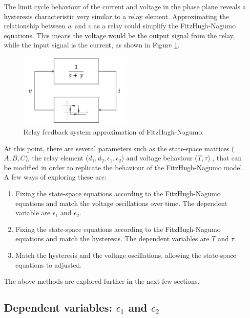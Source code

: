 \documentclass[a4paper]{article}
\begin{document}
The limit cycle behaviour of the current and voltage in the phase plane reveals a hysteresis characteristic very similar to a relay element. Approximating the relationship between $w$ and $v$ as a relay could simplify the FitzHugh-Nagumo equations. This means the voltage would be the output signal from the relay, while the input signal is the current, as shown in Figure \ref{fn_transfer}. 

\begin{figure}
\includegraphics[width = 0.5\textwidth]{fitz_relay_transfer}
\caption{Relay feedback system approximation of FitzHugh-Nagumo.}
\label{fn_transfer}
\end{figure}

At this point, there are several parameters such as the state-space matrices ($A, B, C$), the relay element ($d_1, d_2, \epsilon_1, \epsilon_2$) and voltage behaviour ($T, \tau$) , that can be modified in order to replicate the behaviour of the FitzHugh-Nagumo model. A few ways of exploring these are:
\begin{enumerate}
\item Fixing the state-space equations according to the FitzHugh-Nagumo equations and match the voltage oscillations over time. The dependent variable are $\epsilon_1$ and $\epsilon_2$.
\item Fixing the state-space equations according to the FitzHugh-Nagumo equations and match the hysteresis. The dependent variables are $T$ and $\tau$.
\item Match the hysteresis and the voltage oscillations, allowing the state-space equations to adjusted. 
\end{enumerate}

The above methods are explored further in the next few sections. 

\subsection{Dependent variables: $\epsilon_1 $ and $\epsilon_2$}
\end{document}
